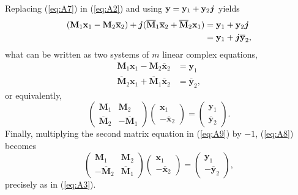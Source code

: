 \documentclass[
	11pt,				%
	openright,			%
	twoside,			%
	a4paper,			%
	french,				%
	brazil,			%
	english				%
	]{abntex2}
\begin{document}
\begin{apendicesenv}
Replacing (\ref{eq:A7}) in (\ref{eq:A2}) and using $ \mathbf{y} = \mathbf{y}_1 + \mathbf{y}_2 \boldsymbol{j}$ yields
\begin{equation}
\begin{aligned}
(\mathbf{M}_1 \mathbf{x}_1 - \mathbf{M}_2 \overline{\mathbf{x}}_2) + \boldsymbol{j} (\overline{\mathbf{M}}_1 \overline{\mathbf{x}}_2 + \overline{\mathbf{M}}_2 \mathbf{x}_1) &=
\mathbf{y}_1 + \mathbf{y}_2 \boldsymbol{j} \\
&= \mathbf{y}_1 + \boldsymbol{j} \overline{\mathbf{y}}_2,
\end{aligned}
\end{equation}
what can be written as two systems of $m$ linear complex equations,
\begin{equation}
\label{eq:A9}
\begin{aligned}
\mathbf{M}_1 \mathbf{x}_1 - \mathbf{M}_2 \overline{\mathbf{x}}_2 &= \mathbf{y}_1 \\
\overline{\mathbf{M}}_2 \mathbf{x}_1 + \overline{\mathbf{M}}_1 \overline{\mathbf{x}}_2&= \overline{\mathbf{y}}_2,
\end{aligned}
\end{equation}
or equivalently,
\begin{equation}
\label{eq:A8}
\begin{pmatrix}
\mathbf{M}_1 & \mathbf{M}_2\\ 
\overline{\mathbf{M}}_2 & - \overline{\mathbf{M}}_1
\end{pmatrix}
\begin{pmatrix}
\mathbf{x}_1 \\ 
- \overline{\mathbf{x}}_2
\end{pmatrix}
=
\begin{pmatrix}
\mathbf{y}_1 \\ 
\overline{\mathbf{y}}_2
\end{pmatrix}.
\end{equation}
Finally, multiplying the second matrix equation in (\ref{eq:A9}) by $ -1 $, (\ref{eq:A8}) becomes
\begin{equation}
\label{eq:10}
\begin{pmatrix}
\mathbf{M}_1 & \mathbf{M}_2\\ 
- \overline{\mathbf{M}}_2 & \overline{\mathbf{M}}_1
\end{pmatrix}
\begin{pmatrix}
\mathbf{x}_1 \\ 
- \overline{\mathbf{x}}_2
\end{pmatrix}
=
\begin{pmatrix}
\mathbf{y}_1 \\ 
- \overline{\mathbf{y}}_2
\end{pmatrix},
\end{equation}
precisely as in (\ref{eq:A3}).

\end{apendicesenv}
\end{document}
